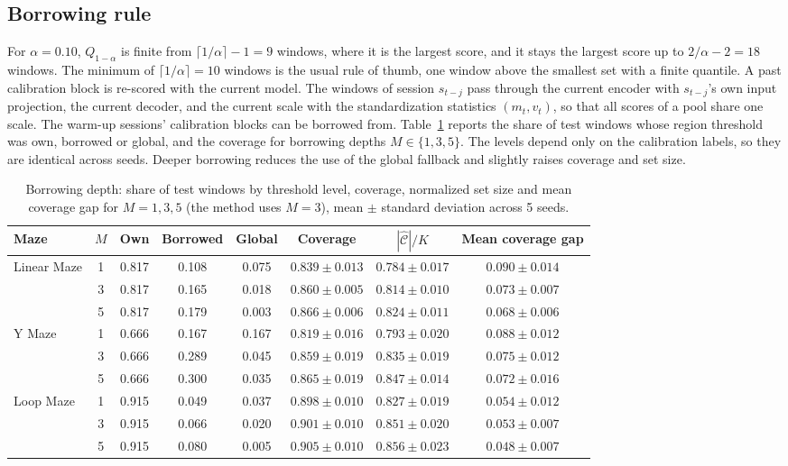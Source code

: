 \documentclass{article}
\begin{document}
\subsection{Borrowing rule}
\label{app:pool}
For $\alpha=0.10$, $Q_{1-\alpha}$ is finite from $\lceil1/\alpha\rceil-1=9$ windows, where it is the largest score, and it stays the largest score up to $2/\alpha-2=18$ windows. The minimum of $\lceil1/\alpha\rceil=10$ windows is the usual rule of thumb, one window above the smallest set with a finite quantile. A past calibration block is re-scored with the current model. The windows of session $s_{t-j}$ pass through the current encoder with $s_{t-j}$'s own input projection, the current decoder, and the current scale with the standardization statistics $(m_t,v_t)$, so that all scores of a pool share one scale. The warm-up sessions' calibration blocks can be borrowed from. Table~\ref{tab:pool} reports the share of test windows whose region threshold was own, borrowed or global, and the coverage for borrowing depths $M\in\{1,3,5\}$. The levels depend only on the calibration labels, so they are identical across seeds. Deeper borrowing reduces the use of the global fallback and slightly raises coverage and set size.

\begin{table}[!ht]
  \caption{Borrowing depth: share of test windows by threshold level, coverage, normalized set size and mean coverage gap for $M=1,3,5$ (the method uses $M=3$), mean $\pm$ standard deviation across 5 seeds.}
  \label{tab:pool}
  \centering\footnotesize
  \begin{tabular}{@{}l *{7}{c}@{}}
    \toprule
    Maze & $M$ & Own & Borrowed & Global & Coverage & $|\widehat{\mathcal{C}}|/K$ & Mean coverage gap \\
    \midrule
    Linear Maze & 1 & 0.817 & 0.108 & 0.075 & $0.839\pm0.013$ & $0.784\pm0.017$ & $0.090\pm0.014$ \\
                & 3 & 0.817 & 0.165 & 0.018 & $0.860\pm0.005$ & $0.814\pm0.010$ & $0.073\pm0.007$ \\
                & 5 & 0.817 & 0.179 & 0.003 & $0.866\pm0.006$ & $0.824\pm0.011$ & $0.068\pm0.006$ \\
    \midrule
    Y Maze      & 1 & 0.666 & 0.167 & 0.167 & $0.819\pm0.016$ & $0.793\pm0.020$ & $0.088\pm0.012$ \\
                & 3 & 0.666 & 0.289 & 0.045 & $0.859\pm0.019$ & $0.835\pm0.019$ & $0.075\pm0.012$ \\
                & 5 & 0.666 & 0.300 & 0.035 & $0.865\pm0.019$ & $0.847\pm0.014$ & $0.072\pm0.016$ \\
    \midrule
    Loop Maze   & 1 & 0.915 & 0.049 & 0.037 & $0.898\pm0.010$ & $0.827\pm0.019$ & $0.054\pm0.012$ \\
                & 3 & 0.915 & 0.066 & 0.020 & $0.901\pm0.010$ & $0.851\pm0.020$ & $0.053\pm0.007$ \\
                & 5 & 0.915 & 0.080 & 0.005 & $0.905\pm0.010$ & $0.856\pm0.023$ & $0.048\pm0.007$ \\
    \bottomrule
  \end{tabular}
\end{table}
\end{document}
